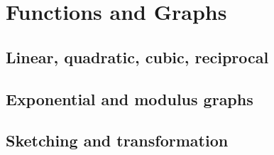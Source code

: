 
\section{Functions and Graphs}

\subsection{Linear, quadratic, cubic, reciprocal}


\subsection{Exponential and modulus graphs}


\subsection{Sketching and transformation}

